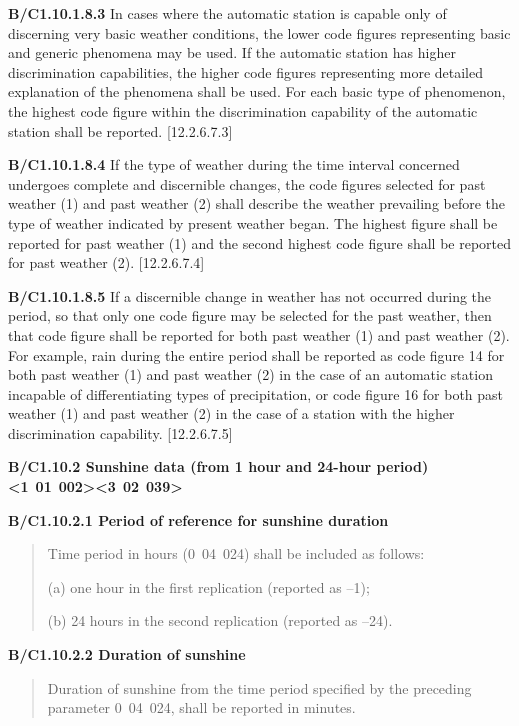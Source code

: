 \textbf{B/C1.10.1.8.3} In cases where the automatic station is capable only of discerning very basic weather conditions, the lower code figures representing basic and generic phenomena may be used. If the automatic station has higher discrimination capabilities, the higher code figures representing more detailed explanation of the phenomena shall be used. For each basic type of phenomenon, the highest code figure within the discrimination capability of the automatic station shall be reported. {[}12.2.6.7.3{]}

\textbf{B/C1.10.1.8.4} If the type of weather during the time interval concerned undergoes complete and discernible changes, the code figures selected for past weather (1) and past weather (2) shall describe the weather prevailing before the type of weather indicated by present weather began. The highest figure shall be reported for past weather (1) and the second highest code figure shall be reported for past weather (2). {[}12.2.6.7.4{]}

\textbf{B/C1.10.1.8.5} If a discernible change in weather has not occurred during the period, so that only one code figure may be selected for the past weather, then that code figure shall be reported for both past weather (1) and past weather (2). For example, rain during the entire period shall be reported as code figure 14 for both past weather (1) and past weather (2) in the case of an automatic station incapable of differentiating types of precipitation, or code figure 16 for both past weather (1) and past weather (2) in the case of a station with the higher discrimination capability. {[}12.2.6.7.5{]}

\textbf{B/C1.10.2 Sunshine data (from 1 hour and 24-hour period) \textless1}~\textbf{01}~\textbf{002\textgreater\textless3}~\textbf{02}~\textbf{039\textgreater{}}

\textbf{B/C1.10.2.1 Period of reference for sunshine duration}

\begin{quote}
Time period in hours (0~04~024) shall be included as follows:

(a) one hour in the first replication (reported as --1);

(b) 24 hours in the second replication (reported as --24).
\end{quote}

\textbf{B/C1.10.2.2 Duration of sunshine}

\begin{quote}
Duration of sunshine from the time period specified by the preceding parameter 0~04~024, shall be reported in minutes.
\end{quote}

